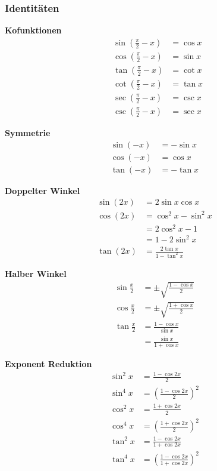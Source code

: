 \subsubsection{Identitäten}
\begin{multicols}{2}

  \textbf{Kofunktionen}
  \begin{align*}
     & \sin(\frac{\pi}{2} - x) & = \cos x \\
     & \cos(\frac{\pi}{2} - x) & = \sin x \\
     & \tan(\frac{\pi}{2} - x) & = \cot x \\
     & \cot(\frac{\pi}{2} - x) & = \tan x \\
     & \sec(\frac{\pi}{2} - x) & = \csc x \\
     & \csc(\frac{\pi}{2} - x) & = \sec x
  \end{align*}

  \textbf{Symmetrie}
  \begin{align*}
    \sin(-x) & = - \sin x \\
    \cos(-x) & = \cos x   \\
    \tan(-x) & = -\tan x
  \end{align*}

  \textbf{Doppelter Winkel}
  \begin{align*}
    \sin(2x) & = 2 \sin x \cos x               \\
    \cos(2x) & = \cos^2 x - \sin^2 x           \\
             & = 2 \cos^2 x - 1                \\
             & = 1 - 2 \sin^2 x                \\
    \tan(2x) & = \frac{2 \tan x}{1 - \tan^2 x}
  \end{align*}

  \textbf{Halber Winkel}
  \begin{align*}
    \sin \frac{x}{2} & = \pm \sqrt{ \frac{1 - \cos x }{2} } \\
    \cos \frac{x}{2} & = \pm \sqrt{ \frac{1 + \cos x }{2} } \\
    \tan \frac{x}{2} & = \frac{1 - \cos x }{\sin x}         \\
                     & = \frac{ \sin x }{ 1 + \cos x }
  \end{align*}

  \textbf{Exponent Reduktion}
  \begin{align*}
    \sin^2 x & = \frac{1 - \cos 2x}{2}               \\
    \sin^4x  & = (\frac{1 - \cos 2x}{2})^2           \\
    \cos^2 x & = \frac{1 + \cos 2x}{2}               \\
    \cos^4x  & = (\frac{1 + \cos 2x}{2})^2           \\
    \tan^2 x & = \frac{1 - \cos 2x}{1 + \cos 2x}     \\
    \tan^4 x & =( \frac{1 - \cos 2x}{1 + \cos 2x})^2
  \end{align*}


\end{multicols}
